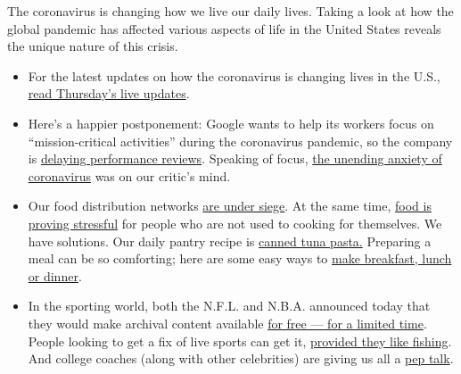The coronavirus is changing how we live our daily lives. Taking a look
at how the global pandemic has affected various aspects of life in the
United States reveals the unique nature of this crisis.

\begin{itemize}
\item
  For the latest updates on how the coronavirus is changing lives in the
  U.S.,
  \href{https://www.nytimes3xbfgragh.onion/live/2020/covid-19-03-19}{read
  Thursday's live updates}.
\item
  Here's a happier postponement: Google wants to help its workers focus
  on ``mission-critical activities'' during the coronavirus pandemic, so
  the company is
  \href{https://www.nytimes3xbfgragh.onion/live/2020/coronavirus-covid-19-03-18?action=click\&module=Top\%20Stories\&pgtype=Homepage\#in-a-happier-postponement-google-presses-pause-on-employee-reviews}{delaying
  performance reviews}. Speaking of focus,
  \href{https://www.nytimes3xbfgragh.onion/2020/03/18/arts/viral-content-coronavirus.html}{the
  unending anxiety of coronavirus} was on our critic's mind.
\item
  Our food distribution networks
  \href{https://www.nytimes3xbfgragh.onion/2020/03/18/business/coronavirus-food-supply-kitchens.html?action=click\&module=RelatedLinks\&pgtype=Article}{are
  under siege}. At the same time,
  \href{https://www.nytimes3xbfgragh.onion/2020/03/17/dining/food-shortage-coronavirus.html}{food
  is proving stressful} for people who are not used to cooking for
  themselves. We have solutions. Our daily pantry recipe is
  \href{https://www.nytimes3xbfgragh.onion/live/2020/coronavirus-covid-19-03-18\#cooking-from-your-pantry-canned-tuna-pasta-edition}{canned
  tuna pasta.} Preparing a meal can be so comforting; here are some easy
  ways to
  \href{https://www.nytimes3xbfgragh.onion/article/easy-recipes-coronavirus.html?action=click\&module=RelatedLinks\&pgtype=Article}{make
  breakfast, lunch or dinner}.
\item
  In the sporting world, both the N.F.L. and N.B.A. announced today that
  they would make archival content available
  \href{https://www.nytimes3xbfgragh.onion/live/2020/coronavirus-covid-19-03-18?action=click\&module=Top\%20Stories\&pgtype=Homepage\#sports-fans-can-rewatch-nba-and-nfl-games-for-free-for-a-limited-time}{for
  free --- for a limited time}. People looking to get a fix of live
  sports can get it,
  \href{https://www.nytimes3xbfgragh.onion/live/2020/coronavirus-covid-19-03-18\#people-fishing-for-sports-to-watch-are-in-luck}{provided
  they like fishing}. And college coaches (along with other celebrities)
  are giving us all a
  \href{https://www.nytimes3xbfgragh.onion/live/2020/coronavirus-covid-19-03-18?action=click\&module=Top\%20Stories\&pgtype=Homepage\#top-coaches-in-college-sports-are-helping-spread-the-word-about-the-coronavirus}{pep
  talk}.
\end{itemize}

